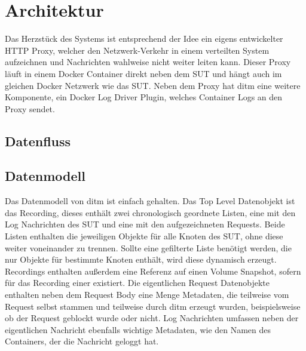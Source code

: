 \documentclass[12pt,a4paper]{report}
\begin{document}
\section{Architektur}
Das Herzstück des Systems ist entsprechend der Idee ein eigens entwickelter HTTP Proxy, welcher den Netzwerk-Verkehr in
einem verteilten System aufzeichnen und Nachrichten wahlweise nicht weiter leiten kann. Dieser Proxy läuft in einem
Docker Container direkt neben dem SUT und hängt auch im gleichen Docker Netzwerk wie das SUT. Neben dem Proxy hat
ditm eine weitere Komponente, ein Docker Log Driver Plugin, welches Container Logs an den Proxy sendet.
\subsection{Datenfluss}

\subsection{Datenmodell}
Das Datenmodell von ditm ist einfach gehalten. Das Top Level Datenobjekt ist das Recording, dieses enthält zwei chronologisch
geordnete Listen, eine mit den Log Nachrichten des SUT und eine mit den aufgezeichneten Requests. Beide Listen enthalten
die jeweiligen Objekte für alle Knoten des SUT, ohne diese weiter voneinander zu trennen. Sollte eine gefilterte Liste
benötigt werden, die nur Objekte für bestimmte Knoten enthält, wird diese dynamisch erzeugt. Recordings enthalten außerdem
eine Referenz auf einen Volume Snapshot, sofern für das Recording einer existiert.
Die eigentlichen Request Datenobjekte enthalten neben dem Request Body eine Menge Metadaten, die teilweise vom Request selbst
stammen und teilweise durch ditm erzeugt wurden, beispielsweise ob der Request geblockt wurde oder nicht.
Log Nachrichten umfassen neben der eigentlichen Nachricht ebenfalls wichtige Metadaten, wie den Namen des Containers, der die
Nachricht geloggt hat.
\end{document}

